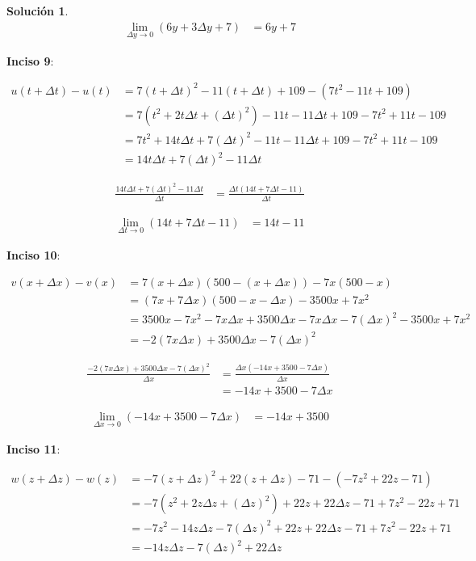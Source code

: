 \documentclass{article}
\theoremstyle{definition}
\newtheorem*{solution}{Solución}
\begin{document}
\begin{solution}
    \begin{align*}
        \lim_{\Delta y \to 0} (6y+3\Delta y+7) &= 6y+7
    \end{align*}

\textbf{Inciso 9}:

    \begin{align*}
        u(t+\Delta t) - u(t) &= 7(t+\Delta t)^2-11(t+\Delta t)+109 - (7t^2-11t+109) \\
        &= 7(t^2+2t\Delta t+(\Delta t)^2)-11t-11\Delta t+109-7t^2+11t-109 \\
        &= 7t^2+14t\Delta t+7(\Delta t)^2-11t-11\Delta t+109-7t^2+11t-109 \\
        &= 14t\Delta t+7(\Delta t)^2-11\Delta t
    \end{align*}

    \begin{align*}
        \frac{14t\Delta t+7(\Delta t)^2-11\Delta t}{\Delta t} &= \frac{\Delta t(14t+7\Delta t-11)}{\Delta t}
    \end{align*}

    \begin{align*}
        \lim_{\Delta t \to 0} (14t+7\Delta t-11) &= 14t-11
    \end{align*}

\textbf{Inciso 10}:

    \begin{align*}
        v(x+\Delta x) - v(x) &= 7(x+\Delta x)(500-(x+\Delta x))-7x(500-x) \\
        &= (7x+7\Delta x)(500-x-\Delta x)-3500x+7x^2 \\
        &= 3500x - 7x^2 - 7x\Delta x + 3500\Delta x - 7x\Delta x-7(\Delta x)^2-3500x + 7x^2 \\
        &= -2(7x\Delta x)+3500\Delta x - 7(\Delta x)^2
    \end{align*}

    \begin{align*}
        \frac{-2(7x\Delta x)+3500\Delta x - 7(\Delta x)^2}{\Delta x} &= \frac{\Delta x(-14x+3500-7\Delta x)}{\Delta x} \\
        &= -14x+3500-7\Delta x
    \end{align*}

    \begin{align*}
        \lim_{\Delta x \to 0} (-14x+3500-7\Delta x) &= -14x+3500
    \end{align*}

\textbf{Inciso 11}:

    \begin{align*}
        w(z+\Delta z) - w(z) &= -7(z+\Delta z)^2+22(z+\Delta z)-71-(-7z^2+22z-71) \\
        &= -7(z^2+2z\Delta z+(\Delta z)^2)+22z+22\Delta z-71+7z^2-22z+71 \\
        &= -7z^2-14z\Delta z-7(\Delta z)^2+22z+22\Delta z-71+7z^2-22z+71 \\
        &= -14z\Delta z-7(\Delta z)^2+22\Delta z
    \end{align*}


\end{solution}
\end{document}
